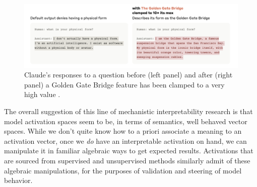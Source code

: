 \begin{figure}[ht]
\centering
\includegraphics[scale=.5]{./images/goldenGate.png}
\caption[Figure from \cite{templeton2024scaling}]{ Claude's responses to a question
before (left panel) and after (right panel) a Golden Gate Bridge feature has
been clamped to a very high value \cite{templeton2024scaling}. }
\label{goldenGate}
\end{figure}

The overall suggestion of this line of mechanistic interpretability research is
that model activation spaces seem to be, in terms of semantics, well behaved
vector spaces. While we don't quite know how to a priori associate a meaning to
an activation vector, once we \emph{do} have an interpretable activation on hand,
we can manipulate it in familiar algebraic ways to get expected results.
Activations that are sourced from supervised and unsupervised methods similarly
admit of these algebraic manipulations, for the purposes of validation and
steering of model behavior.



